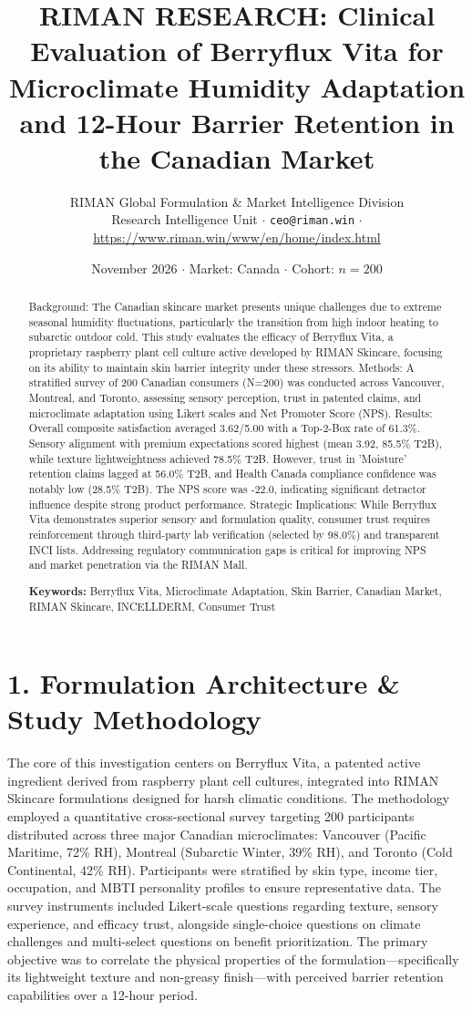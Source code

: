 \documentclass[10pt,twocolumn,a4paper]{article}
\title{\textbf{RIMAN RESEARCH: Clinical Evaluation of Berryflux Vita for Microclimate Humidity Adaptation and 12-Hour Barrier Retention in the Canadian Market}}
\author{RIMAN Global Formulation \& Market Intelligence Division\\
\small Research Intelligence Unit $\cdot$ \texttt{ceo@riman.win} $\cdot$ \url{https://www.riman.win/www/en/home/index.html}}
\date{November 2026 \quad $\cdot$ \quad Market: Canada \quad $\cdot$ \quad Cohort: $n = 200$}
\begin{document}
\maketitle

\begin{abstract}
Background: The Canadian skincare market presents unique challenges due to extreme seasonal humidity fluctuations, particularly the transition from high indoor heating to subarctic outdoor cold. This study evaluates the efficacy of Berryflux Vita, a proprietary raspberry plant cell culture active developed by RIMAN Skincare, focusing on its ability to maintain skin barrier integrity under these stressors. Methods: A stratified survey of 200 Canadian consumers (N=200) was conducted across Vancouver, Montreal, and Toronto, assessing sensory perception, trust in patented claims, and microclimate adaptation using Likert scales and Net Promoter Score (NPS). Results: Overall composite satisfaction averaged 3.62/5.00 with a Top-2-Box rate of 61.3\%. Sensory alignment with premium expectations scored highest (mean 3.92, 85.5\% T2B), while texture lightweightness achieved 78.5\% T2B. However, trust in 'Moisture' retention claims lagged at 56.0\% T2B, and Health Canada compliance confidence was notably low (28.5\% T2B). The NPS score was -22.0, indicating significant detractor influence despite strong product performance. Strategic Implications: While Berryflux Vita demonstrates superior sensory and formulation quality, consumer trust requires reinforcement through third-party lab verification (selected by 98.0\%) and transparent INCI lists. Addressing regulatory communication gaps is critical for improving NPS and market penetration via the RIMAN Mall.

\vspace{0.4em}
\noindent\textbf{Keywords:} Berryflux Vita, Microclimate Adaptation, Skin Barrier, Canadian Market, RIMAN Skincare, INCELLDERM, Consumer Trust
\end{abstract}

\section{1. Formulation Architecture \& Study Methodology}
The core of this investigation centers on Berryflux Vita, a patented active ingredient derived from raspberry plant cell cultures, integrated into RIMAN Skincare formulations designed for harsh climatic conditions. The methodology employed a quantitative cross-sectional survey targeting 200 participants distributed across three major Canadian microclimates: Vancouver (Pacific Maritime, 72\% RH), Montreal (Subarctic Winter, 39\% RH), and Toronto (Cold Continental, 42\% RH). Participants were stratified by skin type, income tier, occupation, and MBTI personality profiles to ensure representative data. The survey instruments included Likert-scale questions regarding texture, sensory experience, and efficacy trust, alongside single-choice questions on climate challenges and multi-select questions on benefit prioritization. The primary objective was to correlate the physical properties of the formulation—specifically its lightweight texture and non-greasy finish—with perceived barrier retention capabilities over a 12-hour period.
\end{document}
